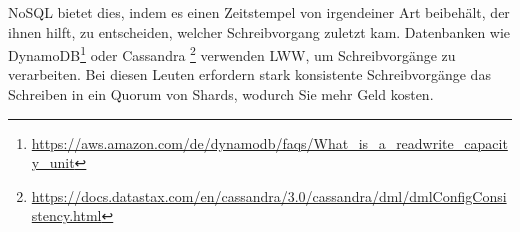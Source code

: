 NoSQL bietet dies, indem es einen Zeitstempel von irgendeiner Art beibehält, der ihnen hilft, zu entscheiden, welcher Schreibvorgang zuletzt kam. Datenbanken wie DynamoDB\footnote{\url{https://aws.amazon.com/de/dynamodb/faqs/What_is_a_readwrite_capacity_unit}} oder Cassandra \footnote{\url{https://docs.datastax.com/en/cassandra/3.0/cassandra/dml/dmlConfigConsistency.html}} verwenden LWW, um Schreibvorgänge zu verarbeiten.
Bei diesen Leuten erfordern stark konsistente Schreibvorgänge das Schreiben in ein Quorum von Shards, wodurch Sie mehr Geld kosten.
